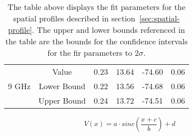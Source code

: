 \begin{table}
\begin{tabular}{||c | c || c c c c||}
				\hline
				\multirow{3}{4em}{9 GHz} & Value & 0.23 & 13.64 & -74.60 & 0.06 \\ 
				& Lower Bound & 0.22 & 13.56 & -74.68 & 0.06 \\ 
				& Upper Bound & 0.24 & 13.72 & -74.51 & 0.06 \\ 
				\hline
			\end{tabular}
			\caption[Spatial Profile Fit Parameters]{The table above displays the fit parameters for the spatial profiles described in section~\ref{sec:spatial-profile}. The upper and lower bounds referenced in the table are the bounds for the confidence intervals for the fir parameters to $2\sigma$.}
		\end{table}

\begin{equation}
\label{eq:vxrestate}
V(x) = a\cdot sinc\left(\frac{x+c}{b}\right) + d
\end{equation}

\clearpage
\newpage
